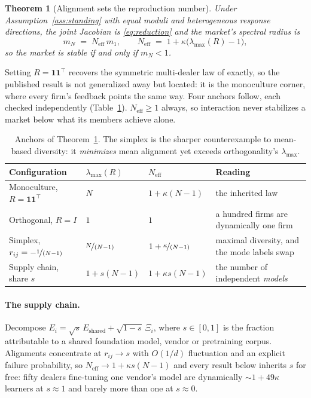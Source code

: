 \documentclass{article}
\theoremstyle{plain}
\newtheorem{theorem}{Theorem}
\theoremstyle{definition}
\newcommand{\Neff}{N_{\mathrm{eff}}}
\newcommand{\mN}{m_N}
\newcommand{\lmax}{\lambda_{\max}}
\begin{document}
\begin{theorem}[Alignment sets the reproduction number]
\label{thm:alignment}
Under Assumption~\ref{ass:standing} with equal moduli and heterogeneous response directions, the joint Jacobian is \eqref{eq:reduction} and the market's spectral radius is
\begin{equation}
\mN \;=\; \Neff\, m_1, \qquad \Neff \;=\; 1 + \kappa\bigl(\lmax(R) - 1\bigr),
\end{equation}
so the market is stable if and only if $\mN < 1$.
\end{theorem}

Setting $R = \mathbf{1}\mathbf{1}^{\top}$ recovers the symmetric multi-dealer law of \citet{reflex2026} exactly, so the published result is not generalized away but located: it is the monoculture corner, where every firm's feedback points the same way. Four anchors follow, each checked independently (Table~\ref{tab:anchors}). $\Neff \geq 1$ always, so interaction never stabilizes a market below what its members achieve alone.

\begin{table}[t]
\centering
\caption{Anchors of Theorem~\ref{thm:alignment}. The simplex is the sharper counterexample to mean-based diversity: it \emph{minimizes} mean alignment yet exceeds orthogonality's $\lmax$.}
\label{tab:anchors}
\small
\begin{tabular}{llll}
\toprule
Configuration & $\lmax(R)$ & $\Neff$ & Reading \\
\midrule
Monoculture, $R=\mathbf{1}\mathbf{1}^{\top}$ & $N$ & $1+\kappa(N-1)$ & the inherited law \\
Orthogonal, $R=I$ & $1$ & $1$ & a hundred firms are dynamically one firm \\
Simplex, $r_{ij}=-\nicefrac{1}{(N-1)}$ & $\nicefrac{N}{(N-1)}$ & $1+\nicefrac{\kappa}{(N-1)}$ & maximal diversity, and the mode labels swap \\
Supply chain, share $s$ & $1+s(N-1)$ & $1+\kappa s(N-1)$ & the number of independent \emph{models} \\
\bottomrule
\end{tabular}
\end{table}

\paragraph{The supply chain.}
Decompose $E_i = \sqrt{s}\,E_{\text{shared}} + \sqrt{1-s}\,\Xi_i$, where $s\in[0,1]$ is the fraction attributable to a shared foundation model, vendor or pretraining corpus. Alignments concentrate at $r_{ij}\to s$ with $O(1/d)$ fluctuation and an explicit failure probability, so $\Neff \to 1 + \kappa s (N-1)$ and every result below inherits $s$ for free: fifty dealers fine-tuning one vendor's model are dynamically ${\sim}1+49\kappa$ learners at $s\approx 1$ and barely more than one at $s \approx 0$.
\end{document}
